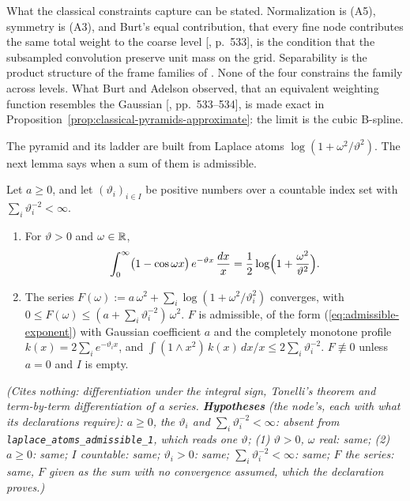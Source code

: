 What the classical constraints capture can be stated. Normalization is (A5), symmetry is (A3), and
Burt's equal contribution, that every fine node contributes the same total weight to the coarse
level [, p.~533], is the condition that the subsampled convolution preserve
unit mass on the grid. Separability is the product structure of the frame families of
. None of the four constrains the family across levels. What
Burt and Adelson observed, that an equivalent weighting function resembles the Gaussian
[, pp.~533--534], is made exact in Proposition~\ref{prop:classical-pyramids-approximate}:
the limit is the cubic B-spline.

The \Matern{} pyramid and its ladder are built from Laplace atoms $\log(1 + \omega^2/\vartheta^2)$.
The next lemma says when a sum of them is admissible.

\begin{lemma}
\label{lem:laplace-atoms-admissible}
\leanok
Let $a \ge 0$, and let $(\vartheta_i)_{i \in I}$ be positive numbers over a countable index set
with $\sum_i\vartheta_i^{-2} < \infty$.
\begin{enumerate}
\item For $\vartheta > 0$ and $\omega \in \mathbb{R}$,
\[
  \int_0^\infty\bigl(1 - \cos\omega x\bigr)\,e^{-\vartheta x}\,\frac{dx}{x}
  = \frac12\log\Bigl(1 + \frac{\omega^2}{\vartheta^2}\Bigr).
\]
\item The series $F(\omega) := a\,\omega^2 + \sum_i\log(1 + \omega^2/\vartheta_i^2)$ converges, with
$0 \le F(\omega) \le (a + \sum_i\vartheta_i^{-2})\,\omega^2$. $F$ is admissible, of the form
(\ref{eq:admissible-exponent}) with Gaussian coefficient $a$ and the completely monotone profile
$k(x) = 2\sum_ie^{-\vartheta_ix}$, and $\int(1 \wedge x^2)\,k(x)\,dx/x \le 2\sum_i\vartheta_i^{-2}$.
$F \not\equiv 0$ unless $a = 0$ and $I$ is empty.
\end{enumerate}
\statusT\quad\emph{(Cites nothing: differentiation under the integral sign, Tonelli's theorem and
term-by-term differentiation of a series. \textbf{Hypotheses} (the node's, each with what its
declarations require): $a \ge 0$, the $\vartheta_i$ and $\sum_i\vartheta_i^{-2} < \infty$: absent from
\texttt{laplace\_atoms\_admissible\_1}, which reads one $\vartheta$; (1) $\vartheta > 0$, $\omega$
real: same; (2) $a \ge 0$: same; $I$ countable: same; $\vartheta_i > 0$: same;
$\sum_i\vartheta_i^{-2} < \infty$: same; $F$ the series: same, $F$ given as the sum with no
convergence assumed, which the declaration proves.)}
\end{lemma}


